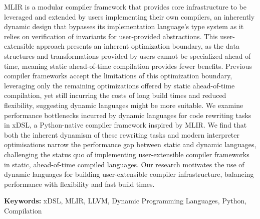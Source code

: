MLIR is a modular compiler framework that provides core infrastructure to be leveraged and extended by users implementing their own compilers, an inherently dynamic design that bypasses its implementation language's type system as it relies on verification of invariants for user-provided abstractions.
This user-extensible approach presents an inherent optimization boundary, as the data structures and transformations provided by users cannot be specialized ahead of time, meaning static ahead-of-time compilation provides fewer benefits.
Previous compiler frameworks accept the limitations of this optimization boundary, leveraging only the remaining optimizations offered by static ahead-of-time compilation, yet still incurring the costs of long build times and reduced flexibility, suggesting dynamic languages might be more suitable.
We examine performance bottlenecks incurred by dynamic languages for code rewriting tasks in xDSL, a Python-native compiler framework inspired by MLIR.
We find that both the inherent dynamism of these rewriting tasks and modern interpreter optimisations narrow the performance gap between static and dynamic languages, challenging the status quo of implementing user-extensible compiler frameworks in static, ahead-of-time compiled languages.
Our research motivates the use of dynamic languages for building user-extensible compiler infrastructure, balancing performance with flexibility and fast build times.


\textbf{Keywords: } xDSL, MLIR, LLVM, Dynamic Programming Languages, Python, Compilation
